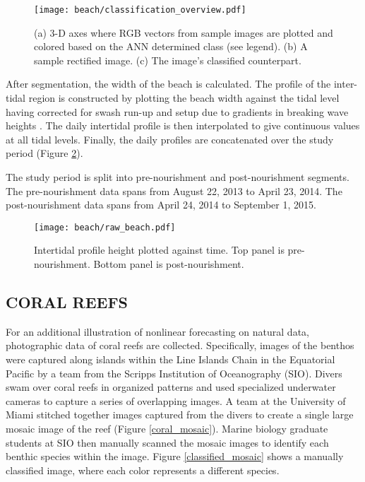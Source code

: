 \begin{figure}[htbp] %
   \centering
   \texttt{[image: beach/classification\_overview.pdf]} 
   \caption{(a) 3-D axes where RGB vectors from sample images are plotted and colored based on the ANN determined class (see legend). (b) A sample rectified image. (c) The image’s classified counterpart.}
   \label{classification_overview}
\end{figure}

After segmentation, the width of the beach is calculated. The profile of the inter-tidal region is constructed by plotting the beach width against the tidal level having corrected for swash run-up and setup due to gradients in breaking wave heights \cite{intertidal_esitimation}. The daily intertidal profile is then interpolated to give continuous values at all tidal levels. Finally, the daily profiles are concatenated over the study period (Figure \ref{beach}). 

The study period is split into pre-nourishment and post-nourishment segments. The pre-nourishment data spans from August 22, 2013 to April 23, 2014. The post-nourishment data spans from April 24, 2014 to September 1, 2015.


\begin{figure}[htbp] %
   \centering
   \texttt{[image: beach/raw\_beach.pdf]} 
   \caption{Intertidal profile height plotted against time. Top panel is pre-nourishment. Bottom panel is post-nourishment.}
   \label{beach}
\end{figure}





\subsection{CORAL REEFS}

For an additional illustration of nonlinear forecasting on natural data, photographic data of coral reefs are collected. Specifically, images of the benthos were captured along islands within the Line Islands Chain in the Equatorial Pacific by a team from the Scripps Institution of Oceanography (SIO). Divers swam over coral reefs in organized patterns and used specialized underwater cameras to capture a series of overlapping images. A team at the University of Miami stitched together images captured from the divers to create a single large mosaic image of the reef (Figure \ref{coral_mosaic}). Marine biology graduate students at SIO then manually scanned the mosaic images to identify each benthic species within the image. Figure \ref{classified_mosaic} shows a manually classified image, where each color represents a different species.

